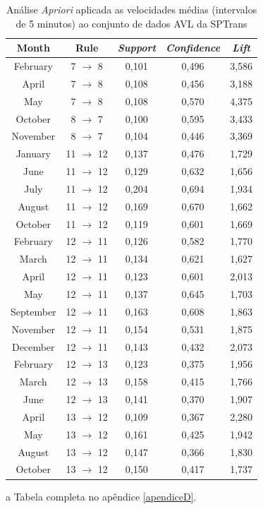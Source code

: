\documentclass[
	12pt,				%
	oneside,			%
	a4paper,			%
	english,			%
	brazil				%
	]{abntex2ppgsi}
\begin{document}
\begin{table}[!htb]
\centering
\begin{threeparttable}
\caption {Análise \textit{Apriori} aplicada as velocidades médias (intervalos de 5 minutos) ao conjunto de dados AVL da SPTrans}
\label {tab:aprioriFull}
\begin{tabular}{c|c|c|c|c}
\hline
\textbf{Month} & \textbf{Rule} & \textit{\textbf{Support}} & \textit{\textbf{Confidence}} & \textit{\textbf{Lift}} \\
\hline
February & 7 $\rightarrow$ 8 & 0,101 & 0,496 & 3,586\\
April & 7 $\rightarrow$ 8  & 0,108 & 0,456 & 3,188\\
May & 7 $\rightarrow$ 8 & 0,108 & 0,570 & 4,375\\
\hline
\hline
October & 8 $\rightarrow$ 7 & 0,100 & 0,595 & 3,433\\
November & 8 $\rightarrow$ 7 & 0,104 & 0,446 & 3,369\\
\hline
\hline
January & 11 $\rightarrow$ 12 & 0,137 & 0,476 & 1,729 \\
June & 11 $\rightarrow$ 12 & 0,129 & 0,632 & 1,656\\
July & 11 $\rightarrow$ 12 & 0,204 & 0,694 & 1,934\\
August & 11 $\rightarrow$ 12 & 0,169 & 0,670 & 1,662\\
October & 11 $\rightarrow$ 12 & 0,119 & 0,601 & 1,669\\
\hline
\hline
February & 12 $\rightarrow$ 11 & 0,126 & 0,582 & 1,770\\
March & 12 $\rightarrow$ 11 & 0,134 & 0,621 & 1,627\\
April & 12 $\rightarrow$ 11 & 0,123 & 0,601 & 2,013\\
May & 12 $\rightarrow$ 11 & 0,137 & 0,645 & 1,703\\
September & 12 $\rightarrow$ 11 & 0,163 & 0,608 & 1,863\\
November & 12 $\rightarrow$ 11 & 0,154 & 0,531 & 1,875\\
December & 12 $\rightarrow$ 11 & 0,143 & 0,432 & 2,073\\
\hline
\hline
February & 12 $\rightarrow$ 13 & 0,123 & 0,375 & 1,956\\
March & 12 $\rightarrow$ 13 & 0,158 & 0,415 & 1,766\\
June & 12 $\rightarrow$ 13 & 0,141 & 0,370 & 1,907\\
\hline
\hline
April  & 13 $\rightarrow$ 12 & 0,109 & 0,367 & 2,280\\
May & 13 $\rightarrow$ 12 & 0,161 & 0,425 & 1,942\\
August & 13 $\rightarrow$ 12 & 0,147 & 0,366 & 1,830\\
October & 13 $\rightarrow$ 12 & 0,150 & 0,417 & 1,737\\
\hline
\end{tabular}
\begin{tablenotes}
            \item[a] Tabela completa no apêndice \ref{apendiceD}.
        \end{tablenotes}
\end{threeparttable}
\end{table}
\end{document}

